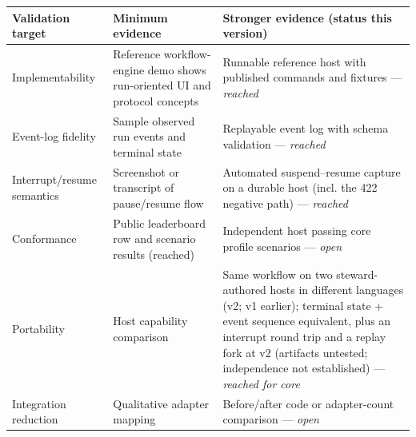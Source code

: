 \documentclass[11pt]{article}
\begin{document}
\begin{table}[H]\centering\footnotesize
\begin{tabular}{>{\raggedright\arraybackslash}p{}>{\raggedright\arraybackslash}p{}>{\raggedright\arraybackslash}p{}}\hline
\textbf{Validation target} & \textbf{Minimum evidence} & \textbf{Stronger evidence (status this version)} \\\hline
Implementability & Reference workflow-engine demo shows run-oriented UI and protocol concepts & Runnable reference host with published commands and fixtures --- \emph{reached} \\\hline
Event-log fidelity & Sample observed run events and terminal state & Replayable event log with schema validation --- \emph{reached} \\\hline
Interrupt/resume semantics & Screenshot or transcript of pause/resume flow & Automated suspend--resume capture on a durable host (incl. the 422 negative path) --- \emph{reached} \\\hline
Conformance & Public leaderboard row and scenario results (reached) & Independent host passing core profile scenarios --- \emph{open} \\\hline
Portability & Host capability comparison & Same workflow on two steward-authored hosts in different languages (v2; v1 earlier); terminal state + event sequence equivalent, plus an interrupt round trip and a replay fork at v2 (artifacts untested; independence not established) --- \emph{reached for core} \\\hline
Integration reduction & Qualitative adapter mapping & Before/after code or adapter-count comparison --- \emph{open} \\\hline
\end{tabular}\end{table}
\end{document}
